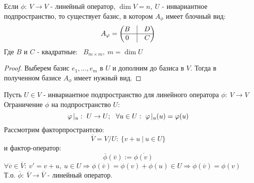     \begin{theorem}
        Если $\phi: \ V \to V$ - линейный оператор, $\dim V = n, \ U$ - инвариантное подпространство, то существует базис, в котором $A_\phi$ имеет блочный вид: 
        $$A_\phi = \begin{pmatrix}
            B & \vline & D \\ \hline 0 & \vline & C
        \end{pmatrix}$$
        Где $B$ и $C$ - квадратные: \ $B_{m \times m}, \ m = \dim U$   
    \end{theorem}
    \begin{proof}
        Выберем базис $e_1,...,e_m$ в $U$ и дополним до базиса в $V$. Тогда в полученном базисе $A_\phi$ имеет нужный вид. 
    \end{proof}
    \begin{remark}
        Пусть $U \in V$ - инвариантное подпространство для линейного оператора $\phi: \ V \to V$\\
        Ограничение $\phi$ на подпространство $U$: 
        $$\phi \hspace{0.05cm} |_u : \ U \to U; \ \  \forall u \in U: \ \phi \hspace{0.05cm} |_u (u) = \phi(u)$$
        Рассмотрим факторпространтсво: $$\overline{V} = V/U : \ \{v + u \ | \ u \in U\}$$
        и фактор-оператор: 
        $$\overline{\phi}(\overline{v}):=\overline{\phi(v)}$$
        $\forall \overline{v} \in \overline{V}: \ v' = v + u, \ u \in U \Longrightarrow \phi(\overline{v}) = \phi(v) + \phi(u) \in U \Longrightarrow \phi(\overline{v}) = \phi(v)$\\
        Т.о. $\overline{\phi}: \ \overline{V} \to \overline{V}$ - линейный оператор. 
    \end{remark}
    \tab
